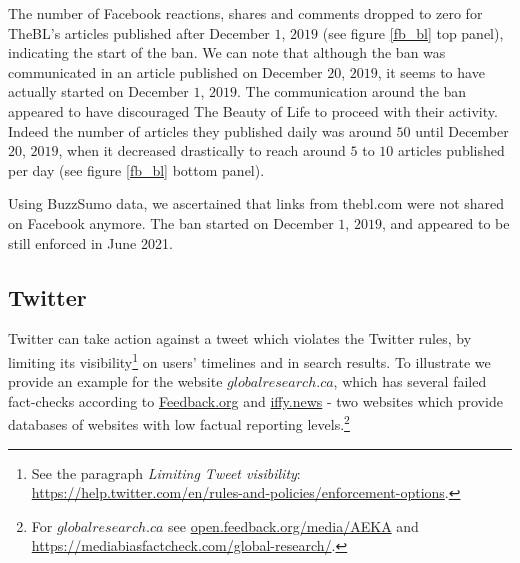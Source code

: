 \documentclass{article}
\begin{document}
The number of Facebook reactions, shares and comments dropped to zero for TheBL’s articles published after December $1$, $2019$ (see figure \ref{fb_bl} top panel), indicating the start of the ban. We can note that although the ban was communicated in an article published on December $20$, $2019$, it seems to have actually started on December $1$, $2019$. The communication around the ban appeared to have discouraged The Beauty of Life to proceed with their activity. Indeed the number of articles they published daily was around $50$ until December $20$, $2019$, when it decreased drastically to reach around $5$ to $10$ articles published per day (see figure \ref{fb_bl} bottom panel). 

Using BuzzSumo data, we ascertained that links from thebl.com were not shared on Facebook anymore. The ban started on December $1$, $2019$, and appeared to be still enforced in June 2021.

\subsection{Twitter}  \label{globalresearch}

Twitter can take action against a tweet which violates the Twitter rules, by limiting its visibility\footnote{See the paragraph {\it Limiting Tweet visibility}: \href{https://help.twitter.com/en/rules-and-policies/enforcement-options}{https://help.twitter.com/en/rules-and-policies/enforcement-options}.} on users' timelines and in search results. To illustrate we provide an example for the website $globalresearch.ca$, which has several failed fact-checks according to \href{https://open.feedback.org/media/AEKA}{Feedback.org} and \href{https://iffy.news}{iffy.news} - two websites which provide databases of websites with low factual reporting levels.\footnote{For $globalresearch.ca$ see \href{https://open.feedback.org/media/AEKA}{open.feedback.org/media/AEKA} and \href{https://mediabiasfactcheck.com/global-research/}{https://mediabiasfactcheck.com/global-research/}.}
\end{document}
